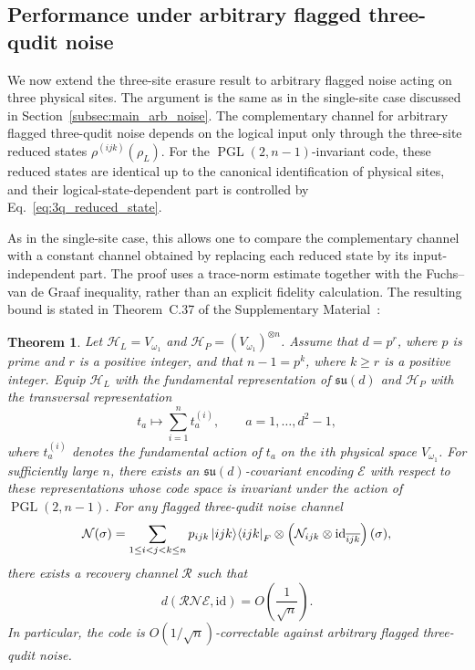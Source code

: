 \documentclass[10pt,twocolumn,superscriptaddress,aps,amsmath,amssymb,citeautoscript,floatfix,prx,longbibliography]{revtex4-2}
\newtheorem{theorem}{Theorem}
\theoremstyle{plain}
\theoremstyle{plain}
\theoremstyle{plain}
\theoremstyle{plain}
\theoremstyle{plain}
\theoremstyle{plain}
\begin{document}
\subsection{Performance under arbitrary flagged three-qudit noise}\label{subsec:main_arb_3_noise}

We now extend the three-site erasure result to arbitrary flagged noise acting on three physical sites. The argument is the same as in the single-site case discussed in Section~\ref{subsec:main_arb_noise}. The complementary channel for arbitrary flagged three-qudit noise depends on the logical input only through the three-site reduced states $\rho^{(ijk)}(\rho_L)$. For the $\operatorname{PGL}(2,n-1)$-invariant code, these reduced states are identical up to the canonical identification of physical sites, and their logical-state-dependent part is controlled by Eq.~\eqref{eq:3q_reduced_state}.

As in the single-site case, this allows one to compare the complementary channel with a constant channel obtained by replacing each reduced state by its input-independent part. The proof uses a trace-norm estimate together with the Fuchs--van de Graaf inequality, rather than an explicit fidelity calculation. The resulting bound is stated in Theorem~C.37 of the Supplementary Material~\cite{SuppMat}:

\begin{theorem}
Let $\mathcal H_L=V_{\omega_1}$ and $\mathcal H_P=(V_{\omega_1})^{\otimes n}$. Assume that $d=p^r$, where $p$ is prime and $r$ is a positive integer, and that $n-1=p^k$, where $k\ge r$ is a positive integer. Equip $\mathcal H_L$ with the fundamental representation of $\mathfrak{su}(d)$ and $\mathcal H_P$ with the transversal representation
$$
    t_a
    \longmapsto
    \sum_{i=1}^n t_a^{(i)},
    \qquad
    a=1,\ldots,d^2-1,
$$
where $t_a^{(i)}$ denotes the fundamental action of $t_a$ on the $i$th physical space $V_{\omega_1}$. For sufficiently large $n$, there exists an $\mathfrak{su}(d)$-covariant encoding $\mathcal E$ with respect to these representations whose code space is invariant under the action of $\operatorname{PGL}(2,n-1)$. For any flagged three-qudit noise channel
$$
    \mathcal N(\sigma)
    =
    \sum_{1\le i<j<k\le n}
    p_{ijk}
    \ket{ijk}\!\bra{ijk}_F
    \otimes
    \left(
        \mathcal N_{ijk}\otimes\mathrm{id}_{\overline{ijk}}
    \right)(\sigma),
$$
there exists a recovery channel $\mathcal R$ such that
$$
    d(\mathcal R\mathcal N\mathcal E,\mathrm{id})
    =
    O\left(\frac{1}{\sqrt n}\right).
$$
In particular, the code is $O(1/\sqrt n)$-correctable against arbitrary flagged three-qudit noise.
\end{theorem}
\end{document}
